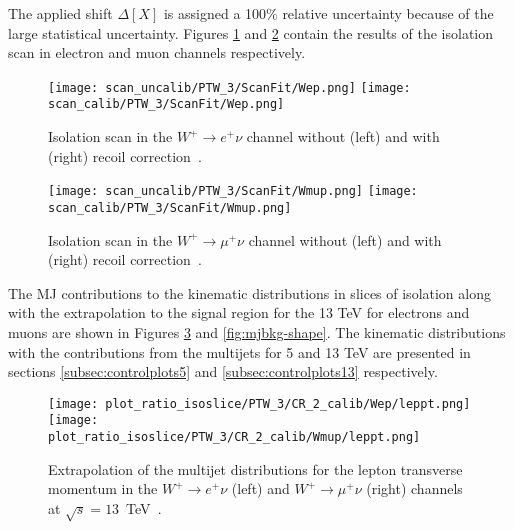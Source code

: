 The applied shift $\Delta[X]$ is assigned a 100\% relative uncertainty because of the large statistical uncertainty. Figures \ref{fig:mjbkg-elp-corr-scan} and \ref{fig:mjbkg-mup-corr-scan} contain the results of the isolation scan in electron and muon channels respectively. 

\begin{figure}[htbp]
	\centering
	\texttt{[image: scan\_uncalib/PTW\_3/ScanFit/Wep.png]}
	\texttt{[image: scan\_calib/PTW\_3/ScanFit/Wep.png]}\\
	\caption{Isolation scan in the $W^+\to e^+\nu$ channel without (left) and with (right) recoil correction~\cite{mjets_int_note_6}.}
	\label{fig:mjbkg-elp-corr-scan}
\end{figure}

\begin{figure}[htbp]
	\centering
	\texttt{[image: scan\_uncalib/PTW\_3/ScanFit/Wmup.png]}
	\texttt{[image: scan\_calib/PTW\_3/ScanFit/Wmup.png]}\\
	\caption{Isolation scan in the $W^+\to \mu^+\nu$ channel without (left) and with (right) recoil correction~\cite{mjets_int_note_6}.}
	\label{fig:mjbkg-mup-corr-scan}
\end{figure}

The MJ contributions to the kinematic distributions in slices of isolation along with the extrapolation to the signal region for the 13 TeV for electrons and muons are shown in Figures \ref{fig:mjbkg-shape-lep} and \ref{fig:mjbkg-shape}. The kinematic distributions with the contributions from the multijets for 5 and 13 TeV are presented in sections \ref{subsec:controlplots5} and \ref{subsec:controlplots13} respectively.
\begin{figure}[htbp]
	\centering
	\texttt{[image: plot\_ratio\_isoslice/PTW\_3/CR\_2\_calib/Wep/leppt.png]}
	\texttt{[image: plot\_ratio\_isoslice/PTW\_3/CR\_2\_calib/Wmup/leppt.png]}\\
	\caption{Extrapolation of the multijet distributions for the lepton transverse momentum in the $W^+\to e^+\nu$ (left) and $W^+\to \mu^+\nu$ (right) channels at $\sqrt{s}=13$~TeV~\cite{mjets_int_note_6}.}
	\label{fig:mjbkg-shape-lep}
\end{figure}


